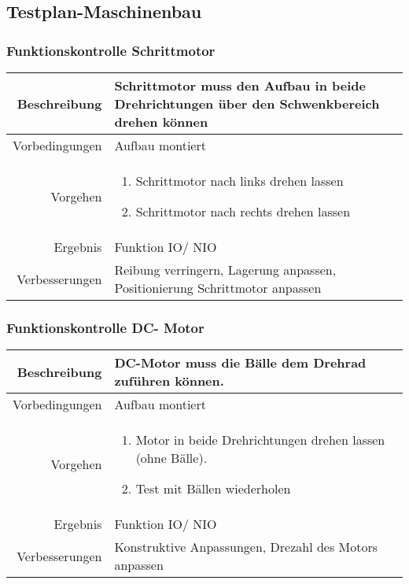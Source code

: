 \subsection{Testplan-Maschinenbau}
\subsubsection{Funktionskontrolle Schrittmotor}
\begin{table}[h!]
	\renewcommand{\arraystretch}{1.5}
	\begin{tabular}{|r|p{14cm}|}
		\hline Beschreibung & Schrittmotor muss den Aufbau in beide Drehrichtungen über den Schwenkbereich drehen können  \\ 
		\hline Vorbedingungen & Aufbau montiert \\ 
		\hline Vorgehen & 
		\begin{enumerate}
			\item Schrittmotor nach links drehen lassen 
			\item Schrittmotor nach rechts drehen lassen
		\end{enumerate} \\ 
		\hline Ergebnis & Funktion IO/ NIO \\ 
		\hline Verbesserungen & Reibung verringern, Lagerung anpassen, Positionierung Schrittmotor anpassen \\ 
		\hline 
	\end{tabular}
\end{table}

\subsubsection{Funktionskontrolle DC- Motor}
\begin{table}[h!]
	\renewcommand{\arraystretch}{1.5}
	\begin{tabular}{|r|p{14cm}|}
		\hline Beschreibung & DC-Motor muss die Bälle dem Drehrad zuführen können.  \\ 
		\hline Vorbedingungen & Aufbau montiert \\ 
		\hline Vorgehen & 
		\begin{enumerate}
			\item Motor in beide Drehrichtungen drehen lassen (ohne Bälle). 
			\item Test mit Bällen wiederholen
		\end{enumerate} \\ 
		\hline Ergebnis & Funktion IO/ NIO \\ 
		\hline Verbesserungen & Konstruktive Anpassungen, Drezahl des Motors anpassen \\ 
		\hline 
	\end{tabular}
\end{table}
\newpage

